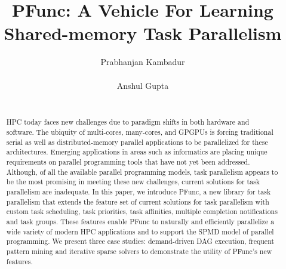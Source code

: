 \documentclass{sig-alternate}
\begin{document}
%

\title{PFunc: A Vehicle For Learning Shared-memory Task Parallelism}


\author{
\alignauthor Prabhanjan Kambadur\\ \\
\alignauthor Anshul Gupta\\ \\
}

\maketitle

\begin{abstract} 
HPC today faces new challenges due to paradigm shifts in both
hardware and software. The ubiquity of multi-cores, many-cores, and GPGPUs
is forcing traditional serial as well as distributed-memory parallel
applications to be parallelized for these architectures.  Emerging applications
in areas such as informatics are placing unique requirements on parallel
programming tools that have not yet been addressed.
%
Although, of all the available parallel programming models, task parallelism
appears to be the most promising in meeting these new challenges, current
solutions for task parallelism are inadequate.
%
In this paper, we introduce PFunc, a new library for task parallelism that
extends the feature set of current solutions for task parallelism with custom
task scheduling, task priorities, task affinities, multiple completion
notifications and task groups.
%
These features enable PFunc to naturally and efficiently parallelize a wide
variety of modern HPC applications and to support the SPMD model of parallel
programming.
%
We present three case studies: demand-driven DAG execution, frequent pattern
mining and iterative sparse solvers to demonstrate the utility of PFunc's new
features.  
\end{abstract}
\end{document}
